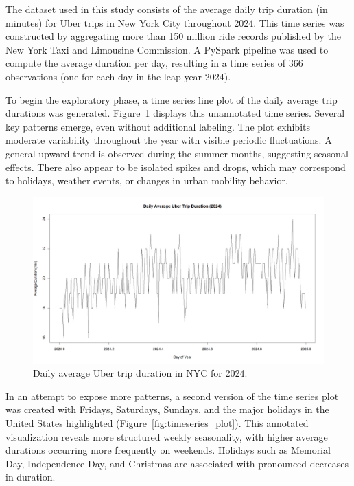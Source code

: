 \documentclass{article}
\begin{document}
The dataset used in this study consists of the average daily trip duration (in minutes) for Uber trips in New York City throughout 2024. This time series was constructed by aggregating more than 150 million ride records published by the New York Taxi and Limousine Commission. A PySpark pipeline was used to compute the average duration per day, resulting in a time series of 366 observations (one for each day in the leap year 2024).


To begin the exploratory phase, a time series line plot of the daily average trip durations was generated. Figure~\ref{fig:initial_plot} displays this unannotated time series. Several key patterns emerge, even without additional labeling. The plot exhibits moderate variability throughout the year with visible periodic fluctuations. A general upward trend is observed during the summer months, suggesting seasonal effects. There also appear to be isolated spikes and drops, which may correspond to holidays, weather events, or changes in urban mobility behavior.

\begin{figure}
  \includegraphics[width=\textwidth]{avg_trip_duration_simple.png}
  \caption{Daily average Uber trip duration in NYC for 2024.}
  \label{fig:initial_plot}
\end{figure}

In an attempt to expose more patterns, a second version of the time series plot was created with Fridays, Saturdays, Sundays, and the major holidays in the United States highlighted (Figure~\ref{fig:timeseries_plot}). This annotated visualization reveals more structured weekly seasonality, with higher average durations occurring more frequently on weekends. Holidays such as Memorial Day, Independence Day, and Christmas are associated with pronounced decreases in duration.
\end{document}
